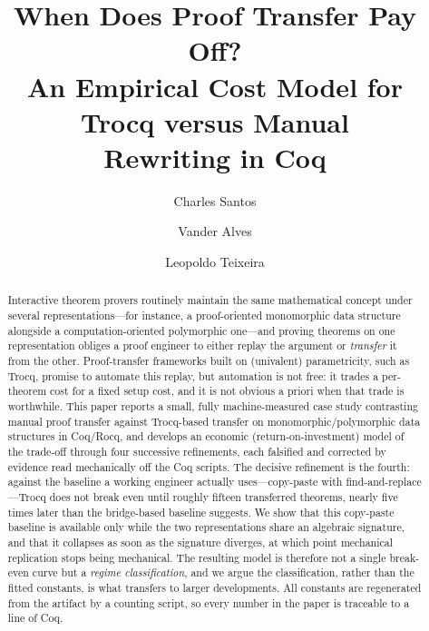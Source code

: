 \documentclass[runningheads]{llncs}
\begin{document}
\title{When Does Proof Transfer Pay Off?\\
An Empirical Cost Model for Trocq versus Manual\\
Rewriting in Coq}


\author{Charles Santos \and Vander Alves \and Leopoldo Teixeira}


\maketitle

\begin{abstract}
Interactive theorem provers routinely maintain the same mathematical concept
under several representations---for instance, a proof-oriented monomorphic
data structure alongside a computation-oriented polymorphic one---and proving
theorems on one representation obliges a proof engineer to either replay the
argument or \emph{transfer} it from the other. Proof-transfer frameworks
built on (univalent) parametricity, such as Trocq, promise to automate this
replay, but automation is not free: it trades a per-theorem cost for a fixed
setup cost, and it is not obvious a priori when that trade is worthwhile.
This paper reports a small, fully machine-measured case study contrasting
manual proof transfer against Trocq-based transfer on monomorphic/polymorphic
data structures in Coq/Rocq, and develops an economic (return-on-investment)
model of the trade-off through four successive refinements, each falsified and
corrected by evidence read mechanically off the Coq scripts. The decisive
refinement is the fourth: against the baseline a working engineer actually
uses---copy-paste with find-and-replace---Trocq does not break even until
roughly fifteen transferred theorems, nearly five times later than the
bridge-based baseline suggests. We show that this copy-paste baseline is
available only while the two representations share an algebraic signature,
and that it collapses as soon as the signature diverges, at which point
mechanical replication stops being mechanical. The resulting model is
therefore not a single break-even curve but a \emph{regime classification},
and we argue the classification, rather than the fitted constants, is what
transfers to larger developments. All constants are regenerated from the
artifact by a counting script, so every number in the paper is traceable to a
line of Coq.

\end{abstract}
\end{document}
